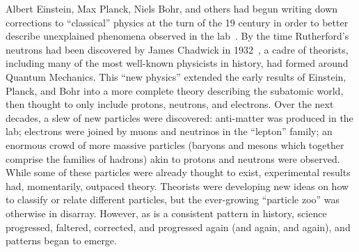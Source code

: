 \begin{dissertationintroduction}
Albert Einstein, Max Planck, Niels Bohr, and others had begun writing down corrections to ``classical'' physics at the turn of the 19 century in order to better describe unexplained phenomena observed in the lab~\cite{EinsteinPhotoelectric, Planck, Bohr}. 
By the time Rutherford's neutrons had been discovered by James Chadwick in 1932~\cite{Chadwick1932}, a cadre of theorists, including many of the most well-known physicists in history\footnotemark{}, had formed around Quantum Mechanics.
This ``new physics'' extended the early results of Einstein, Planck, and Bohr into a more complete theory describing the subatomic world, then thought to only include protons, neutrons, and electrons. 
Over the next decades, a slew of new particles were discovered: 
anti-matter was produced in the lab; %
electrons were joined by muons and neutrinos in the ``lepton'' family; %
an enormous crowd of more massive particles (baryons and mesons which together comprise the families of hadrons) akin to protons and neutrons were observed. %
While some of these particles were already thought to exist, experimental results had, momentarily, outpaced theory. 
Theorists were developing new ideas on how to classify or relate different particles, but the ever-growing ``particle zoo'' was otherwise in disarray. 
However, as is a consistent pattern in history, science progressed, faltered, corrected, and progressed again (and again, and again), and patterns began to emerge. 


\end{dissertationintroduction}
